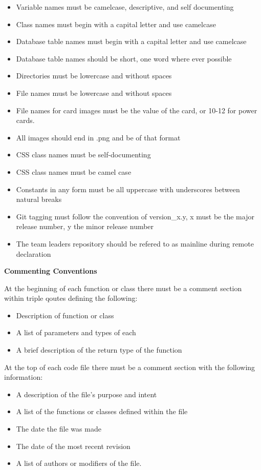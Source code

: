 \documentclass[12pt]{IEEEtran}
\begin{document}
	\begin{itemize}
		\item Variable names must be camelcase, descriptive, and self documenting
		\item Class names must begin with a capital letter and use camelcase 
		\item Database table names must begin with a capital letter and use camelcase
		\item Database table names should be short, one word where ever possible
		\item Directories must be lowercase and without spaces
		\item File names must be lowercase and without spaces
		\item File names for card images must be the value of the card, or 10-12 for power cards.
		\item All images should end in .png and be of that format
		\item CSS class names must be self-documenting
		\item CSS class names must be camel case
		\item Constants in any form must be all uppercase with underscores between natural breaks
		\item Git tagging must follow the convention of version\_x.y, x must be the major release number, y the minor release number
		\item The team leaders repository should be refered to as mainline during remote declaration
	\end{itemize}

	\bfseries Commenting Conventions \mdseries

	At the beginning of each function or class there must be a comment section within triple qoutes defining the following:
	\begin{itemize}
		\item Description of function or class
		\item A list of parameters and types of each
		\item A brief description of the return type of the function
	\end{itemize}

	At the top of each code file there must be a comment section with the following information:
	\begin{itemize}
		\item A description of the file's purpose and intent
		\item A list of the functions or classes defined within the file
		\item The date the file was made
		\item The date of the most recent revision
		\item A list of authors or modifiers of the file. 
	\end{itemize}
\end{document}
